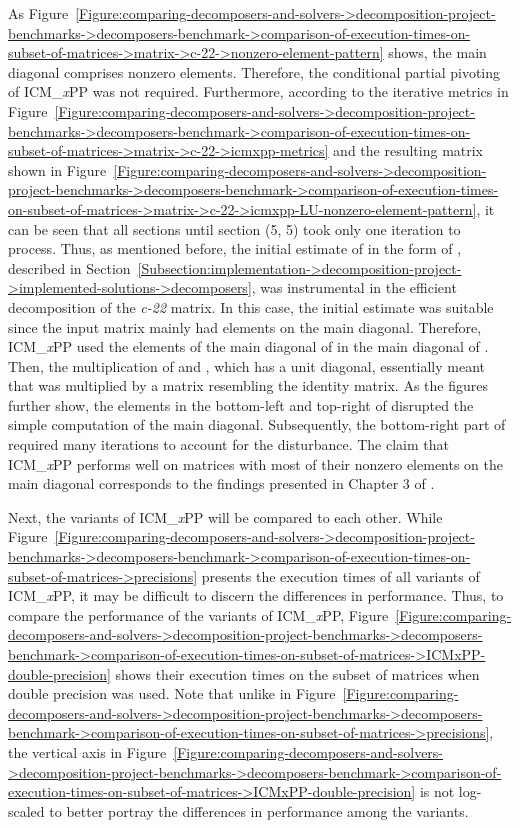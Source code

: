 As Figure~\ref{Figure:comparing-decomposers-and-solvers->decomposition-project-benchmarks->decomposers-benchmark->comparison-of-execution-times-on-subset-of-matrices->matrix->c-22->nonzero-element-pattern} shows, the main diagonal comprises nonzero elements. Therefore, the conditional partial pivoting of ICM\_\textit{x}PP was not required. Furthermore, according to the iterative metrics in Figure~\ref{Figure:comparing-decomposers-and-solvers->decomposition-project-benchmarks->decomposers-benchmark->comparison-of-execution-times-on-subset-of-matrices->matrix->c-22->icmxpp-metrics} and the resulting  matrix shown in Figure~\ref{Figure:comparing-decomposers-and-solvers->decomposition-project-benchmarks->decomposers-benchmark->comparison-of-execution-times-on-subset-of-matrices->matrix->c-22->icmxpp-LU-nonzero-element-pattern}, it can be seen that all sections until section (5, 5) took only one iteration to process. Thus, as mentioned before, the initial estimate of  in the form of , described in Section~\ref{Subsection:implementation->decomposition-project->implemented-solutions->decomposers}, was instrumental in the efficient decomposition of the \textit{c-22} matrix. In this case, the initial estimate was suitable since the input matrix mainly had elements on the main diagonal. Therefore, ICM\_\textit{x}PP used the elements of the main diagonal of  in the main diagonal of . Then, the multiplication of  and , which has a unit diagonal, essentially meant that  was multiplied by a matrix resembling the identity matrix. As the figures further show, the elements in the bottom-left and top-right of  disrupted the simple computation of the main diagonal. Subsequently, the bottom-right part of  required many iterations to account for the disturbance. The claim that ICM\_\textit{x}PP performs well on matrices with most of their nonzero elements on the main diagonal corresponds to the findings presented in Chapter 3 of  \cite{Cejka2022}.

Next, the variants of ICM\_\textit{x}PP will be compared to each other. While Figure~\ref{Figure:comparing-decomposers-and-solvers->decomposition-project-benchmarks->decomposers-benchmark->comparison-of-execution-times-on-subset-of-matrices->precisions} presents the execution times of all variants of ICM\_\textit{x}PP, it may be difficult to discern the differences in performance. Thus, to compare the performance of the variants of ICM\_\textit{x}PP, Figure~\ref{Figure:comparing-decomposers-and-solvers->decomposition-project-benchmarks->decomposers-benchmark->comparison-of-execution-times-on-subset-of-matrices->ICMxPP-double-precision} shows their execution times on the subset of matrices when double precision was used. Note that unlike in Figure~\ref{Figure:comparing-decomposers-and-solvers->decomposition-project-benchmarks->decomposers-benchmark->comparison-of-execution-times-on-subset-of-matrices->precisions}, the vertical axis in Figure~\ref{Figure:comparing-decomposers-and-solvers->decomposition-project-benchmarks->decomposers-benchmark->comparison-of-execution-times-on-subset-of-matrices->ICMxPP-double-precision} is not log-scaled to better portray the differences in performance among the variants.

